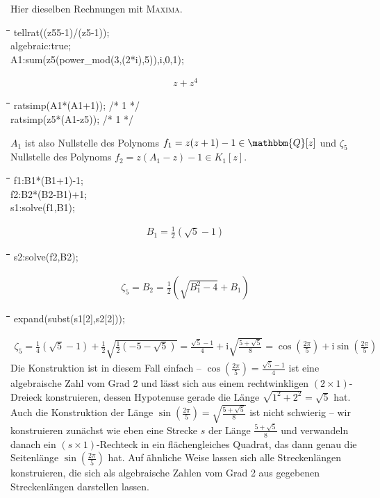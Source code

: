\documentclass[11pt]{article}
\newcommand{\br}[1]{\ensuremath{\left(#1\right)}}
\newcommand{\ii}{\mathrm{i}}
\newcommand{\Q}{\mathbbm{Q}}
\def\pw{{\char94}}
\newenvironment{code}{\tt \begin{tabbing}
\hskip12pt\=\hskip12pt\=\hskip12pt\=\hskip12pt\=\hskip5cm\=\hskip5cm\=\kill}
{\end{tabbing}}
\begin{document}
Hier dieselben Rechnungen mit \textsc{Maxima}.
\begin{code}
tellrat((z5\pw5-1)/(z5-1));\\
algebraic:true;\\
A1:sum(z5\pw(power\_mod(3,(2*i),5)),i,0,1);
\end{code}
\begin{gather*}
  z+z^4
\end{gather*}
\begin{code}
ratsimp(A1*(A1+1));  /* 1 */\\
ratsimp(z5*(A1-z5)); /* 1 */
\end{code}
$A_1$ ist also Nullstelle des Polynoms $f_1=z(z+1)-1\in\Q[z]$ und $\zeta_5$
Nullstelle des Polynoms $f_2=z(A_1-z)-1\in K_1[z]$. 
\begin{code}
f1:B1*(B1+1)-1;   \\
f2:B2*(B2-B1)+1;  \\
s1:solve(f1,B1);
\end{code}
\begin{gather*}
  B_1 = \frac12\br{\sqrt5-1}
\end{gather*}
\begin{code}
s2:solve(f2,B2);
\end{code}
\begin{gather*}
  \zeta_5 = B_2 = \frac12\br{\sqrt{B_1^2-4}+B_1}
\end{gather*}
\begin{code}
expand(subst(s1[2],s2[2]));
\end{code}
\begin{gather*}
  \zeta_5 = \frac14\br{\sqrt5-1}+\frac12\sqrt{\frac12\br{-5-\sqrt5}}
  = \frac{\sqrt5-1}{4}+\ii\sqrt{\frac{5+\sqrt5}{8}} = \cos\br{\frac{2\pi}{5}}
  + \ii\sin\br{\frac{2\pi}{5}}
\end{gather*}
Die Konstruktion ist in diesem Fall einfach --
$\cos\br{\frac{2\pi}{5}}=\frac{\sqrt5-1}{4}$ ist eine algebraische Zahl vom
Grad 2 und lässt sich aus einem rechtwinkligen $(2\times 1)$-Dreieck
konstruieren, dessen Hypotenuse gerade die Länge $\sqrt{1^2+2^2}=\sqrt{5}$
hat.  Auch die Konstruktion der Länge $\sin\br{\frac{2\pi}{5}}
=\sqrt{\frac{5+\sqrt5}{8}}$ ist nicht schwierig -- wir konstruieren zunächst
wie eben eine Strecke $s$ der Länge $\frac{5+\sqrt5}{8}$ und verwandeln danach
ein $(s\times 1)$-Rechteck in ein flächengleiches Quadrat, das dann genau die
Seitenlänge $\sin\br{\frac{2\pi}{5}}$ hat.  Auf ähnliche Weise lassen sich
alle Streckenlängen konstruieren, die sich als algebraische Zahlen vom Grad 2
aus gegebenen Streckenlängen darstellen lassen.
\end{document}
